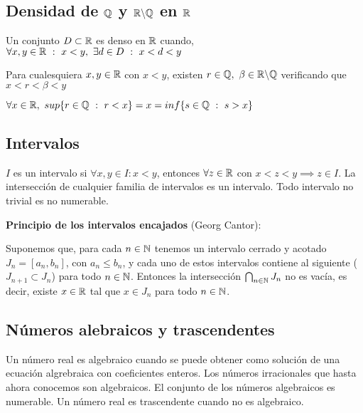 \subsection{Densidad de $\mathbb{Q}$ y $\mathbb{R}\backslash\mathbb{Q}$ en $\mathbb{R}$}
Un conjunto $D\subset \mathbb{R}$ es denso en $\mathbb{R}$ cuando, $\forall x,y\in\mathbb{R} \ : \ x<y, \ \exists d\in D \ : \ x<d<y$

Para cualesquiera $x,y\in\mathbb{R}$ con $x<y$, existen $r\in\Q, \ \beta\in\R\backslash\Q$ verificando que $x<r<\beta <y$
\begin{center}
$\forall x\in\R ,  \ 
sup\{ r\in\Q \ : \ r<x \} = x = inf\{ s\in\Q \ : \ s>x \}$	
\end{center}


\subsection{Intervalos}
$I$ es un intervalo si $\forall x,y\in I : x<y$, entonces $\forall z\in\mathbb{R}$ con $x<z<y\implies z\in I$. La intersección de cualquier familia de intervalos es un intervalo. Todo intervalo no trivial es no numerable.

\textbf{Principio de los intervalos encajados} (Georg Cantor):

Suponemos que, para cada $n\in\mathbb{N}$ tenemos un intervalo cerrado y acotado $J_n=[a_n,b_n]$, con $a_n\leq b_n$, y cada uno de estos intervalos contiene al siguiente ($J_{n+1}\subset J_n$) para todo $n\in\mathbb{N}$. Entonces la intersección $\bigcap _{n\in\mathbb{N}}J_n$ no es vacía, es decir, existe $x\in\mathbb{R}$ tal que $x\in J_n$ para todo $n\in\mathbb{N}$.

\subsection{Números alebraicos y trascendentes}
Un número real es algebraico cuando se puede obtener como solución de una ecuación algrebraica con coeficientes enteros.
Los números irracionales que hasta ahora conocemos son algebraicos. El conjunto de los números algebraicos es numerable.
Un número real es trascendente cuando no es algebraico.
